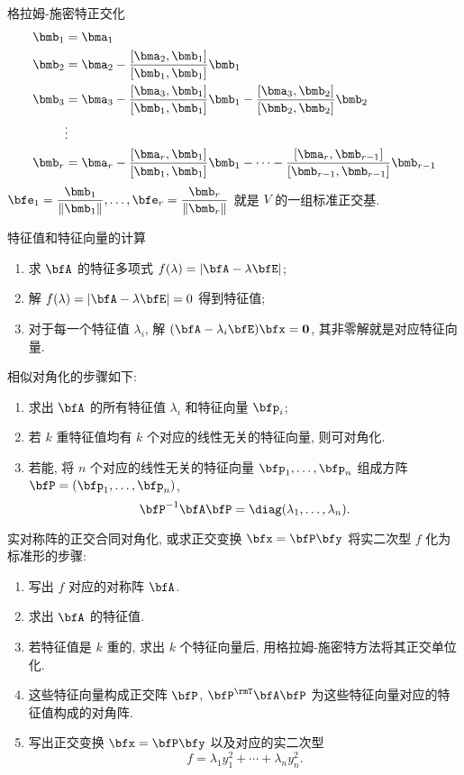 \documentclass[aspectratio=169,handout]{ctexbeamer}
\begin{document}
\begin{frame}{格拉姆-施密特正交化}
	\begin{align*}
		\bmb_1&=\bma_1\\
		\bmb_2&=\bma_2-\frac{[\bma_2,\bmb_1]}{[\bmb_1,\bmb_1]}\bmb_1\\
		\bmb_3&=\bma_3-\frac{[\bma_3,\bmb_1]}{[\bmb_1,\bmb_1]}\bmb_1-\frac{[\bma_3,\bmb_2]}{[\bmb_2,\bmb_2]}\bmb_2\\
		&\vdots\\
		\bmb_r&=\bma_r-\frac{[\bma_r,\bmb_1]}{[\bmb_1,\bmb_1]}\bmb_1-\cdots-\frac{[\bma_r,\bmb_{r-1}]}{[\bmb_{r-1},\bmb_{r-1}]}\bmb_{r-1}
	\end{align*}
	 $\bfe_1=\dfrac{\bmb_1}{\|\bmb_1\|},\dots,\bfe_r=\dfrac{\bmb_r}{\|\bmb_r\|}$ 就是 $V$ 的一组标准正交基.
\end{frame}




\begin{frame}{特征值和特征向量的计算}
	\onslide<+->
	\begin{enumerate}
		\item 求 $\bfA$ 的特征多项式 $f(\lambda)=|\bfA-\lambda \bfE|$;
		\item 解 $f(\lambda)=|\bfA-\lambda \bfE|=0$ 得到特征值;
		\item 对于每一个特征值 $\lambda_i$, 解 $(\bfA-\lambda_i\bfE)\bfx={\bf0}$, 其\alert{非零解}就是对应特征向量.
	\end{enumerate}
	\onslide<+->
	相似对角化的步骤如下:
	\begin{enumerate}
		\item 求出 $\bfA$ 的所有特征值 $\lambda_i$ 和特征向量 $\bfp_i$;
		\item 若 $k$ 重特征值均有 $k$ 个对应的线性无关的特征向量, 则可对角化.
		\item 若能, 将 $n$ 个对应的线性无关的特征向量 $\bfp_1,\dots,\bfp_n$ 组成方阵 $\bfP=(\bfp_1,\dots,\bfp_n)$, 
		\[\bfP^{-1}\bfA\bfP=\diag(\lambda_1,\dots,\lambda_n).\]
	\end{enumerate}
	\vspace{-\baselineskip}
	\onslide<+->
	实对称阵的正交合同对角化, 或求正交变换 $\bfx=\bfP\bfy$ 将实二次型 $f$ 化为标准形的步骤:
	\begin{enumerate}
		\item 写出 $f$ 对应的对称阵 $\bfA$.
		\item 求出 $\bfA$ 的特征值.
		\item \alert{若特征值是 $k$ 重的, 求出 $k$ 个特征向量后, 用格拉姆-施密特方法将其正交单位化.}
		\item 这些特征向量构成正交阵 $\bfP$, $\bfP^\rmT\bfA\bfP$ 为这些特征向量对应的特征值构成的对角阵.
		\item 写出正交变换 $\bfx=\bfP\bfy$ 以及对应的实二次型
		\[f=\lambda_1 y_1^2+\cdots+\lambda_n y_n^2.\]
	\end{enumerate}
\end{frame}
\end{document}
